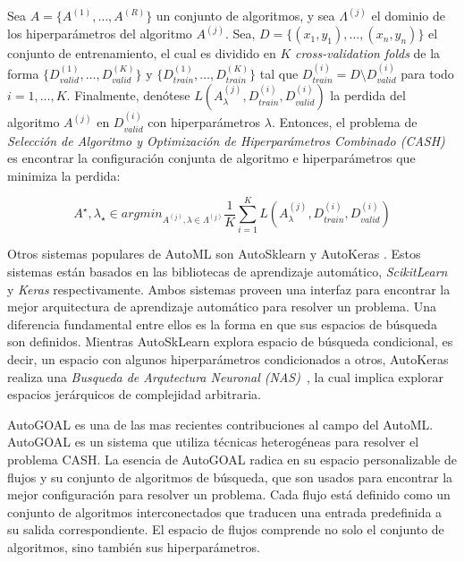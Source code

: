 \begin{definition}
\label{definition:cash}
    Sea $A = \{A^{(1)}, \dots, A^{(R)}\}$ un conjunto de algoritmos, y sea $\Lambda^{(j)}$ el dominio de los hiperparámetros del algoritmo $A^{(j)}$.
    Sea, $D = \{(x_1, y_1), \dots, (x_n, y_n)\}$ el conjunto de entrenamiento, el cual es dividido en $K$ \emph{cross-validation folds} de la forma $\{D_{valid}^{(1)}, \dots, D_{valid}^{(K)}\}$ y $\{D_{train}^{(1)}, \dots, D_{train}^{(K)}\}$ tal que $D_{train}^{(i)} = D \setminus D_{valid}^{(i)}$ para todo $i = 1, \dots, K$. Finalmente, denótese $L(A_{\lambda}^{(j)}, D_{train}^{(i)},D_{valid}^{(i)})$ la perdida del algoritmo $A^{(j)}$ en $D_{valid}^{(i)}$ con hiperparámetros $\lambda$.
    Entonces, el problema de \textit{Selección de Algoritmo y Optimización de Hiperparámetros Combinado (CASH)} es encontrar la configuración conjunta de algoritmo e hiperparámetros que minimiza la perdida:

    \begin{equation}
        A^{\star}, \lambda_{\star} \in argmin_{A^{(j)}, \lambda \in \Lambda^(j)} \frac{1}{K} \sum_{i=1}^K L(A_{\lambda}^{(j)}, D_{train}^{(i)},D_{valid}^{(i)})
    \end{equation}
\end{definition}

Otros sistemas populares de AutoML son AutoSklearn \parencite{feurer2015efficient} y AutoKeras \parencite{autoKeras}.
Estos sistemas están basados en las bibliotecas de aprendizaje automático, \textit{ScikitLearn} \parencite{pedregosa2011scikit} y \textit{Keras} \parencite{chollet2015keras} respectivamente.
Ambos sistemas proveen una interfaz para encontrar la mejor arquitectura de aprendizaje automático para resolver un problema.
Una diferencia fundamental entre ellos es la forma en que sus espacios de búsqueda son definidos.
Mientras AutoSkLearn explora espacio de búsqueda condicional, es decir, un espacio con algunos hiperparámetros condicionados a otros, AutoKeras realiza una \emph{Busqueda de Arqutectura Neuronal (NAS)}~\parencite{NAS}, la cual implica explorar espacios jerárquicos de complejidad arbitraria.

AutoGOAL \parencite{autogoal, estevez2020general} es una de las mas recientes contribuciones al campo del AutoML. AutoGOAL es un sistema que utiliza técnicas heterogéneas para resolver el problema CASH.
La esencia de AutoGOAL radica en su espacio personalizable de flujos y su conjunto de algoritmos de búsqueda, que son usados para encontrar la mejor configuración para resolver un problema.
Cada flujo está definido como un conjunto de algoritmos interconectados que traducen una entrada predefinida a su salida correspondiente.
El espacio de flujos comprende no solo el conjunto de algoritmos, sino también sus hiperparámetros.


